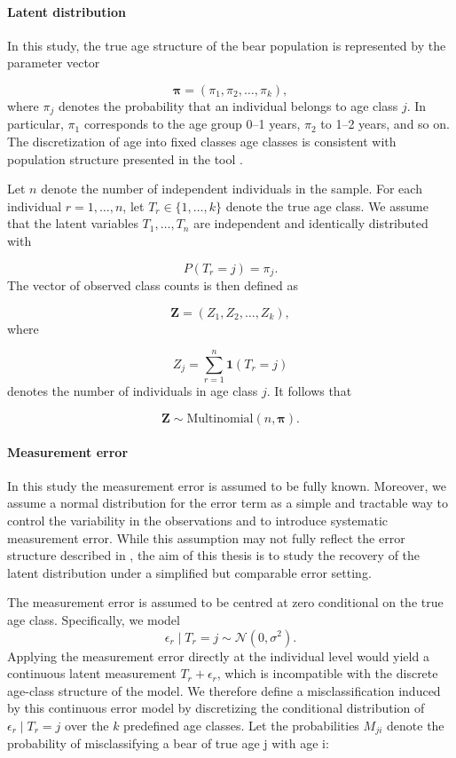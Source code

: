 \documentclass[11pt,a4paper]{article}
\begin{document}
\paragraph{Latent distribution}
In this study, the true age structure of the bear population is represented by the parameter vector

 \begin{equation}
 \boldsymbol{\pi} = (\pi_1, \pi_2, \dots, \pi_k), 
 \label{eq:latent_age_dist}
 \end{equation} 
 where $\pi_j$ denotes the probability that an individual belongs to age class $j$. In particular, $\pi_1$ corresponds to the age group 0--1 years, $\pi_2$ to 1--2 years, and so on. The discretization of age into fixed classes age classes is consistent with population structure presented in the tool \cite{nina_bearmodel}. 
 
Let $n$ denote the number of independent individuals in the sample. For each individual $r = 1,\dots,n$, let $T_r \in \{1,\dots,k\}$ denote the true age class. We assume that the latent variables \(T_1, \dots, T_n\) are independent and identically distributed with

\[
P(T_r = j) = \pi_j.
\]
The vector of observed class counts is then defined as

\[
\boldsymbol{Z} = \left(Z_1, Z_2, \dots, Z_k\right),
\]
where

\[
Z_j = \sum_{r=1}^{n} \boldsymbol{1}(T_r = j)
\]
denotes the number of individuals in age class $j$. It follows that

\[
\boldsymbol{Z} \sim \text{Multinomial}(n, \boldsymbol{\pi}).
\]

\paragraph{Measurement error}\label{par:measurement-error}
 
In this study the measurement error is assumed to be fully known. Moreover, we assume a normal distribution for the error term as a simple and tractable way to control the variability in the observations and to introduce systematic measurement error. While this assumption may not fully reflect the error structure described in \cite{nakamura2023}, the aim of this thesis is to study the recovery of the latent distribution under a simplified but comparable error setting.

The measurement error is assumed to be centred at zero conditional on the true age class. Specifically, we model
\[
\epsilon_r \mid T_r=j \sim \mathcal{N}(0, \sigma^2).
\]
Applying the measurement error directly at the individual level would yield a continuous latent measurement $T_r + \epsilon_r$, which is incompatible with the discrete age-class structure of the model. We therefore define a misclassification induced by this continuous error model by discretizing the conditional distribution of $\epsilon_r \mid T_r = j$ over the $k$ predefined age classes. Let the probabilities $M_{ji}$ denote the probability of misclassifying a bear of true age j with age i:
\end{document}
